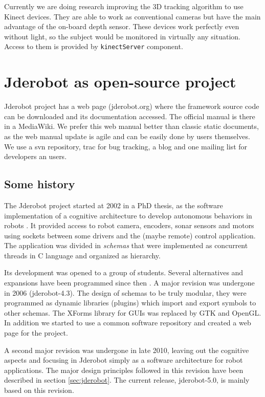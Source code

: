 \documentclass[twocolumn]{svjour3}          %
\begin{document}
Currently we are doing research improving the 3D tracking algorithm to use Kinect devices. They are able to work as conventional cameras but have the main advantage of the on-board depth sensor. These devices work perfectly even without light, so the subject would be monitored in virtually any situation. Access to them is provided by \texttt{kinectServer} component.

\section{Jderobot as open-source project}

Jderobot project has a web page (jderobot.org) where the framework source code can be downloaded and its documentation accessed. The official manual is there in a MediaWiki. We prefer this web manual better than classic static documents, as the web manual update is agile and can be easily done by users themselves. We use a svn repository, trac for bug tracking, a blog and one mailing list for developers an users.

\subsection{Some history}

The Jderobot project started at 2002 in a PhD thesis, as the software implementation of a cognitive architecture to develop autonomous behaviors in robots \cite{canas02,canas05e}. It provided access to robot camera, encoders, sonar sensors and motors using sockets between some drivers and the (maybe remote) control application. The application was divided in \textit{schemas} that were implemented as concurrent threads in C language and organized as hierarchy. 

Its development was opened to a group of students. Several alternatives and expansions have been programmed since then \cite{canas07,canas07f}. A major revision was undergone in 2006 (jderobot-4.3). The design of schemas to be truly modular, they were programmed as dynamic libraries (plugins) which import and export symbols to other schemas. The XForms library for GUIs was replaced by GTK and OpenGL. In addition we started to use a common software repository and created a web page for the project. 

A second major revision was undergone in late 2010, leaving out the cognitive aspects and focusing in Jderobot simply as a software architecture for robot applications. The major design principles followed in this revision have been described in section \ref{sec:jderobot}. The current release, jderobot-5.0, is mainly based on this revision.
\end{document}
